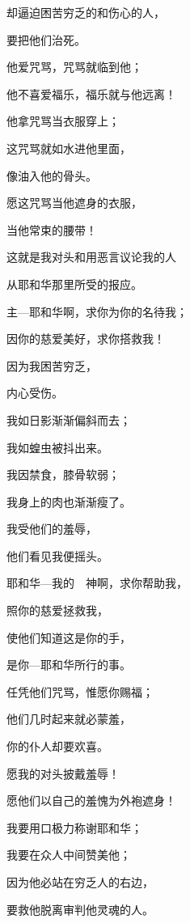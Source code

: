 {\par }{\Q 却逼迫困苦穷乏的和伤心的人，
\par }{\Q 要把他们治死。
\par }{\Q {}他爱咒骂，咒骂就临到他；
\par }{\Q 他不喜爱福乐，福乐就与他远离！
\par }{\Q {}他拿咒骂当衣服穿上；
\par }{\Q 这咒骂就如水进他里面，
\par }{\Q 像油入他的骨头。
\par }{\Q {}愿这咒骂当他遮身的衣服，
\par }{\Q 当他常束的腰带！
\par }{\BB \par }{\Q {}这就是我对头和用恶言议论我的人
\par }{\Q 从耶和华那里所受的报应。
\par }{\Q {}主—耶和华啊，求你为你的名{}待我；
\par }{\Q 因你的慈爱美好，求你搭救我！
\par }{\Q {}因为我困苦穷乏，
\par }{\Q 内心受伤。
\par }{\Q {}我如日影渐渐偏斜而去；
\par }{\Q 我如蝗虫被抖出来。
\par }{\Q {}我因禁食，膝骨软弱；
\par }{\Q 我身上的肉也渐渐瘦了。
\par }{\Q {}我受他们的羞辱，
\par }{\Q 他们看见我便摇头。
\par }{\BB \par }{\Q {}耶和华—我的　神啊，求你帮助我，
\par }{\Q 照你的慈爱拯救我，
\par }{\Q {}使他们知道这是你的手，
\par }{\Q 是你—耶和华所行的事。
\par }{\Q {}任凭他们咒骂，惟愿你赐福；
\par }{\Q 他们几时起来就必蒙羞，
\par }{\Q 你的仆人却要欢喜。
\par }{\Q {}愿我的对头披戴羞辱！
\par }{\Q 愿他们以自己的羞愧为外袍遮身！
\par }{\Q {}我要用口极力称谢耶和华；
\par }{\Q 我要在众人中间赞美他；
\par }{\Q {}因为他必站在穷乏人的右边，
\par }{\Q 要救他脱离审判他灵魂的人。

}
